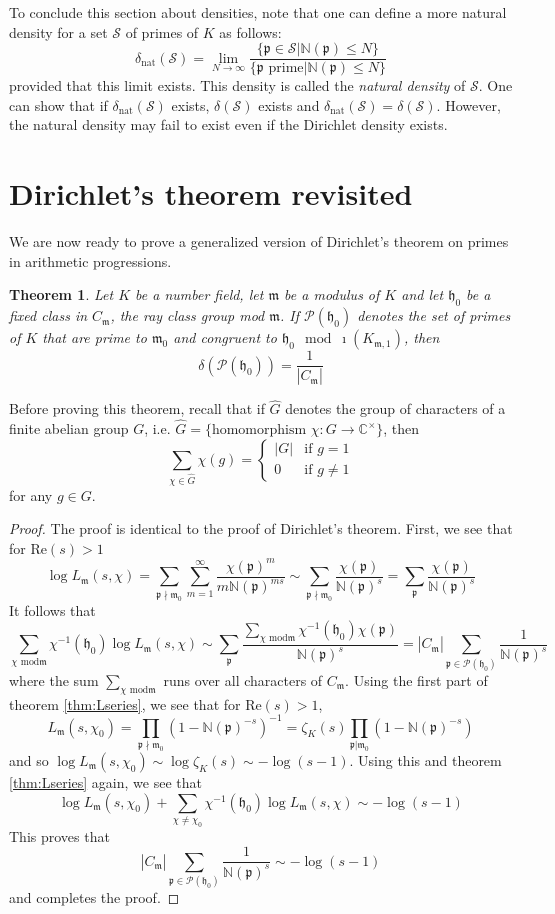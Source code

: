 \documentclass[]{amsart}
\newtheorem{theorem}{Theorem}
\newcommand{\C}{\mathbb{C}}
\renewcommand{\S}{\mathcal{S}}
\newcommand{\dS}{\delta(\mathcal{S})}
\newcommand{\rarr}{\longrightarrow}
\newcommand{\m}{\mathfrak{m}}
\newcommand{\Kmo}{K_{\mathfrak{m},1}}
\newcommand{\h}{\mathfrak{h}_0}
\newcommand{\N}{\mathbb{N}}
\newcommand{\Lms}{L_\mathfrak{m}(s,\chi)}
\newcommand{\p}{\mathfrak{p}}
\begin{document}
			To conclude this section about densities, note that one can define a more natural density for a set $\S$ of primes of $K$ as follows:
			\[\delta_{\text{nat}}(\S)=\lim_{N\rightarrow\infty}\frac{\{\p\in\S|\N(\p)\leq N\}}{\{\p\text{ prime}|\N(\p)\leq N\}}\]
			provided that this limit exists. This density is called the \emph{natural density} of $\S$. One can show that if $\delta_{\text{nat}}(\S)$ exists, $\dS$ exists and $\delta_{\text{nat}}(\S)=\dS$. However, the natural density may fail to exist even if the Dirichlet density exists. 
			
		\section{Dirichlet's theorem revisited}
		We are now ready to prove a generalized version of Dirichlet's theorem on primes in arithmetic progressions. 
		
		\begin{theorem}\label{thm:Dirichlet2}
			Let $K$ be a number field, let $\m$ be a modulus of $K$ and let $\h$ be a fixed class in $C_\m$, the ray class group mod $\m$. If $\mathcal{P}(\h)$ denotes the set of primes of $K$ that are prime to $\m_0$ and congruent to $\h\mod\imath(\Kmo)$, then
			\[\delta(\mathcal{P}(\h))=\frac{1}{|C_\m|}\] 
		\end{theorem}
		Before proving this theorem, recall that if $\hat{G}$ denotes the group of characters of a finite abelian group $G$, i.e. $\hat{G}=\{\text{homomorphism }\chi:G\rarr\C^\times\}$, then
		\[\sum_{\chi\in\hat{G}}\chi(g)=\begin{cases}
			|G| &\text{if }g=1\\
			0	&\text{if }g\neq 1
		\end{cases}\]
		for any $g\in G$.
		\begin{proof}
			The proof is identical to the proof of Dirichlet's theorem. First, we see that for $\text{Re}(s)>1$
			\[\log\Lms=\sum_{\p\nmid\m_0}\sum_{m=1}^\infty\frac{\chi(\p)^m}{m\N(\p)^{ms}}\sim\sum_{\p\nmid\m_0}\frac{\chi(\p)}{\N(\p)^{s}}=\sum_{\p}\frac{\chi(\p)}{\N(\p)^{s}}\]
			It follows that
			\[\sum_{\chi\text{ mod}\m}\chi^{-1}(\h)\log\Lms\sim\sum_{\p}\frac{\sum_{\chi\text{ mod}\m}\chi^{-1}(\h)\chi(\p)}{\N(\p)^s}=|C_\m|\sum_{\p\in\mathcal{P}(\h)}\frac{1}{\N(\p)^s}\]
			where the sum $\sum_{\chi\text{ mod}\m}$ runs over all characters of $C_\m$. Using the first part of theorem \ref{thm:Lseries}, we see that for Re$(s)>1$,
			\[L_\m(s,\chi_0)=\prod_{\p\nmid\m_0}(1-\N(\p)^{-s})^{-1}=\zeta_K(s)\prod_{\p|\m_0}(1-\N(\p)^{-s})\]
			and so $\log L_\m(s,\chi_0)\sim\log\zeta_K(s)\sim-\log(s-1)$. Using this and theorem \ref{thm:Lseries} again, we see that
			\[\log L_\m(s,\chi_0)+\sum_{\chi\neq\chi_0}\chi^{-1}(\h)\log\Lms\sim-\log(s-1)\]
			This proves that
			\[|C_\m|\sum_{\p\in\mathcal{P}(\h)}\frac{1}{\N(\p)^s}\sim-\log(s-1)\]
			and completes the proof.
		\end{proof}
		
\end{document}
